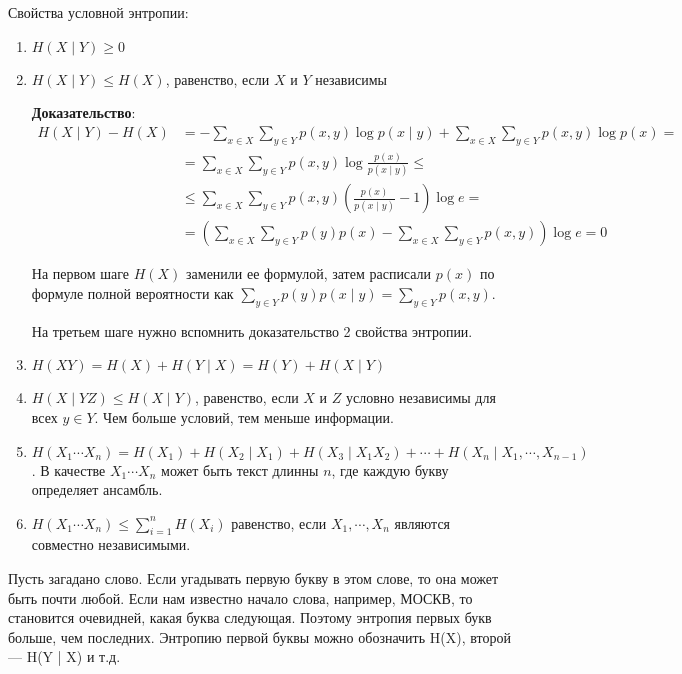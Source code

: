 Свойства условной энтропии:
\begin{enumerate}
    \item $H(X \mid Y) \geq 0$
    \item $H(X \mid Y) \leq H(X)$, равенство, если $X$ и $Y$ независимы

        \textbf{Доказательство}:
        \begin{align*}
            H(X \mid Y) - H(X) &= - \sum_{x \in X} \sum_{y \in Y} p(x, y) \log
                p(x \mid y) + \sum_{x \in X} \sum_{y \in Y} p(x, y) \log p(x)
                =
            \\
            &= \sum_{x \in X} \sum_{y \in Y} 
                p(x, y) \log \frac{p(x)}{p(x \mid y)} \leq
            \\
            &\leq \sum_{x \in X} \sum_{y \in Y} p(x, y) \left(
                \frac{p(x)}{p(x \mid y)} - 1 \right) \log e =
            \\
            &= \left( \sum_{x \in X} \sum_{y \in Y} p(y) p(x) - \sum_{x \in X}
                \sum_{y \in Y} p (x, y) \right) \log e = 0
        \end{align*}

        На первом шаге $H(X)$ заменили ее формулой, затем расписали
        $p(x)$ по формуле полной вероятности как $\sum_{y \in Y} p(y)
        p(x \mid y) = \sum_{y \in Y} p(x, y)$.

        На третьем шаге нужно вспомнить доказательство 2 свойства энтропии.

    \item $H(XY) = H(X) + H(Y \mid X) = H(Y) + H(X \mid Y)$
    \item $H(X \mid YZ) \leq H(X \mid Y)$, равенство, если $X$ и $Z$ условно
        независимы для всех $y \in Y$. Чем больше условий, тем меньше
        информации.
    \item $H(X_1 \cdots X_n) = H(X_1) + H(X_2 \mid X_1) + H(X_3 \mid X_1 X_2)
        + \cdots + H(X_n \mid X_1, \cdots, X_{n-1})$. В качестве $X_1 \cdots X_n$ может
        быть текст длинны $n$, где каждую букву определяет ансамбль.
        
    \item $H(X_1 \cdots X_n) \leq \sum_{i=1}^n H(X_i)$ равенство, если $X_1,
        \cdots, X_n$ являются совместно независимыми.
\end{enumerate}

Пусть загадано слово. Если угадывать первую букву в этом слове, то она может
быть почти любой. Если нам известно начало слова, например, МОСКВ, то
становится очевидней, какая буква следующая. Поэтому энтропия первых букв
больше, чем последних. Энтропию первой буквы можно обозначить H(X), второй ---
H(Y | X) и т.д.

